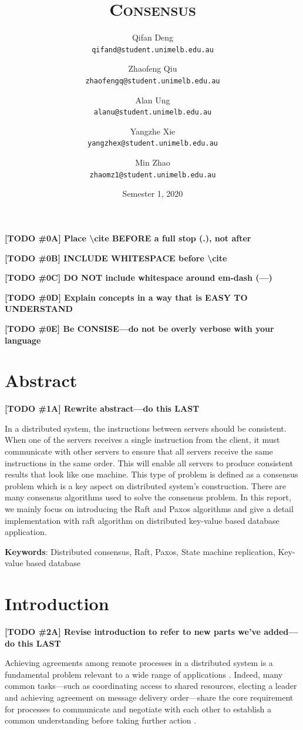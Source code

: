 \documentclass[12pt, a4paper]{article}
\title{\textsc{Consensus}}
\author{
  Qifan Deng \\
  \texttt{\small qifand@student.unimelb.edu.au}
  \and
  Zhaofeng Qiu \\
  \texttt{\small zhaofengq@student.unimelb.edu.au}
  \and
  Alan Ung \\
  \texttt{\small alanu@student.unimelb.edu.au}
  \and
  Yangzhe Xie \\
  \texttt{\small yangzhex@student.unimelb.edu.au}
  \and
  Min Zhao \\
  \texttt{\small zhaomz1@student.unimelb.edu.au}
}
\date{Semester 1, 2020}
\newcommand{\todo}[2]{\textbf{\color{blue}[TODO \##1] #2}\par}
\begin{document}
\maketitle
\thispagestyle{firststyle}

\todo{0A}{Place \textbackslash cite BEFORE a full stop (.), not after}
\todo{0B}{INCLUDE WHITESPACE before \textbackslash cite}
\todo{0C}{DO NOT include whitespace around em-dash (---)}
\todo{0D}{Explain concepts in a way that is EASY TO UNDERSTAND}
\todo{0E}{Be CONSISE---do not be overly verbose with your language}


\section{Abstract}

\todo{1A}{Rewrite abstract---do this LAST}

In a distributed system, the instructions between servers should be consistent. When one of the servers receives a single instruction from the client, it must communicate with other servers to ensure that all servers receive the same instructions in the same order. This will enable all servers to produce consistent results that look like one machine. This type of problem is defined as a consensus problem which is a key aspect on distributed system’s construction. There are many consensus algorithms used to solve the consensus problem. In this report, we mainly focus on introducing the Raft and Paxos algorithms and give a detail implementation with raft algorithm on distributed key-value based database application.

\textbf{Keywords}: Distributed consensus, Raft, Paxos, State machine replication, Key-value based database


\section{Introduction}

\todo{2A}{Revise introduction to refer to new parts we've added---do this LAST}

Achieving agreements among remote processes in a distributed system is a
fundamental problem relevant to a wide range of applications
\cite{fischer1985impossibility, kshemkalyani_singhal_2008}. Indeed, many common
tasks---such as coordinating access to shared resources, electing a leader and
achieving agreement on message delivery order---share the core requirement for
processes to communicate and negotiate with each other to establish a common
understanding before taking further action \cite{kshemkalyani_singhal_2008,
coulouris2005distributed}.
\end{document}

